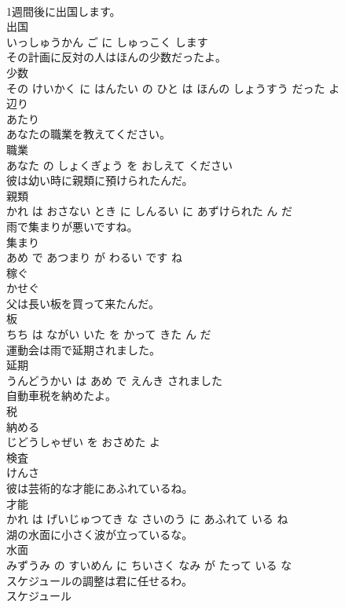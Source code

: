 \documentclass[8pt]{extreport}
\begin{document}
\begin{CJK}{UTF8}{min}
\\	1週間後に出国します。	
\\	出国 
\\	いっしゅうかん ご に しゅっこく します			
\\	その計画に反対の人はほんの少数だったよ。	
\\	少数 
\\	その けいかく に はんたい の ひと は ほんの しょうすう だった よ			
\\	辺り	
\\	あたり		
\\	あなたの職業を教えてください。	
\\	職業 
\\	あなた の しょくぎょう を おしえて ください			
\\	彼は幼い時に親類に預けられたんだ。	
\\	親類 
\\	かれ は おさない とき に しんるい に あずけられた ん だ			
\\	雨で集まりが悪いですね。	
\\	集まり 
\\	あめ で あつまり が わるい です ね			
\\	稼ぐ	
\\	かせぐ		
\\	父は長い板を買って来たんだ。	
\\	板 
\\	ちち は ながい いた を かって きた ん だ			
\\	運動会は雨で延期されました。	
\\	延期 
\\	うんどうかい は あめ で えんき されました			
\\	自動車税を納めたよ。	
\\	税 
\\	納める 
\\	じどうしゃぜい を おさめた よ			
\\	検査	
\\	けんさ		
\\	彼は芸術的な才能にあふれているね。	
\\	才能 
\\	かれ は げいじゅつてき な さいのう に あふれて いる ね			
\\	湖の水面に小さく波が立っているな。	
\\	水面 
\\	みずうみ の すいめん に ちいさく なみ が たって いる な			
\\	スケジュールの調整は君に任せるわ。	
\\	スケジュール 

\end{CJK}
\end{document}
